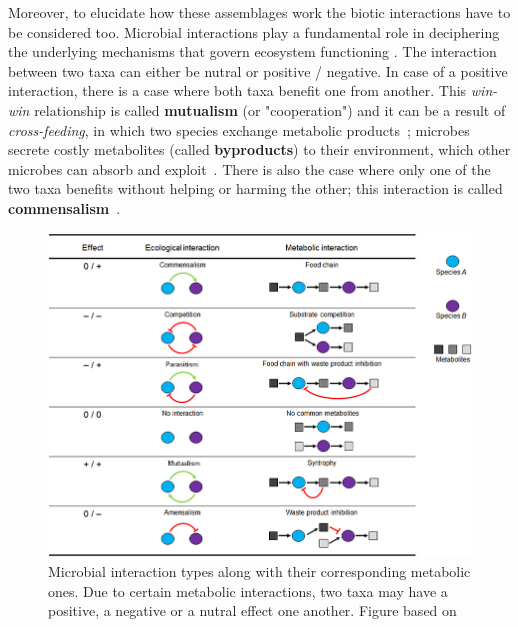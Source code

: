       Moreover, to elucidate how these assemblages work the biotic interactions have to be 
      considered too. 
      Microbial interactions play a fundamental role in deciphering the underlying mechanisms that govern ecosystem functioning \cite{braga2016microbial, faust2012microbial}. 
      The interaction between two taxa can either be nutral or 
      positive / negative.
      In case of a positive interaction, 
      there is a case where both taxa benefit one from another.
      This \textit{win-win} relationship is called \textbf{mutualism} (or "cooperation")
      and it can be a result of
      \textit{cross-feeding}, in which two species exchange metabolic products~\cite{faust2012microbial}; 
      microbes secrete costly metabolites (called \textbf{byproducts}) to their environment, 
      which other microbes can absorb and exploit~\cite{pacheco2019costless}. 
      There is also the case 
      where only one of the two taxa
      benefits without helping or harming the other; 
      this interaction is called \textbf{commensalism}~\cite{faust2012microbial}. 
      

      \begin{figure}
         \centering
         \includegraphics[width=.9\textwidth]{figures/interaction_types.jpg}
         \caption[Microbial interactions types]{Microbial interaction types along 
         with their corresponding metabolic ones.
         Due to certain metabolic interactions, two taxa may have a positive, a negative
         or a nutral effect one another. 
         Figure based on \cite{perez2016metabolic}}
         \label{fig:micro-inter-types}
      \end{figure}
      


